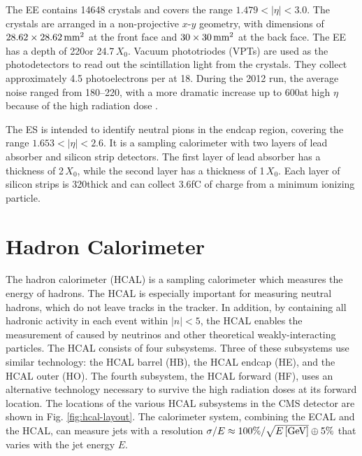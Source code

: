 The EE contains 14648 \pbwo crystals and covers the range $1.479<|\eta|<3.0$. The crystals are arranged in a non-projective $x$-$y$ geometry, with dimensions of $28.62\times28.62\,\text{mm}^{2}$ at the front face and $30\times30\,\text{mm}^{2}$ at the back face. The EE has a depth of 220\mm or 24.7$\,X_{0}$. Vacuum phototriodes (VPTs) are used as the photodetectors to read out the scintillation light from the \pbwo crystals. They collect approximately 4.5 photoelectrons per \MeVns at 18\degC. During the 2012 run, the average noise ranged from 180--220\MeV, with a more dramatic increase up to 600\MeV at high $\eta$ because of the high radiation dose \cite{CMS:2013ecal}.

The ES is intended to identify neutral pions in the endcap region, covering the range $1.653<|\eta|<2.6$. It is a sampling calorimeter with two layers of lead absorber and silicon strip detectors. The first layer of lead absorber has a thickness of 2$\,X_{0}$, while the second layer has a thickness of 1$\,X_{0}$. Each layer of silicon strips is 320\mum thick and can collect 3.6\unit{fC} of charge from a minimum ionizing particle.


\section{Hadron Calorimeter}

The hadron calorimeter (HCAL) is a sampling calorimeter which measures the energy of hadrons. The HCAL is especially important for measuring neutral hadrons, which do not leave tracks in the tracker. In addition, by containing all hadronic activity in each event within $|n|<5$, the HCAL enables the measurement of \met caused by neutrinos and other theoretical weakly-interacting particles. The HCAL consists of four subsystems. Three of these subsystems use similar technology: the HCAL barrel (HB), the HCAL endcap (HE), and the HCAL outer (HO). The fourth subsystem, the HCAL forward (HF), uses an alternative technology necessary to survive the high radiation doses at its forward location. The locations of the various HCAL subsystems in the CMS detector are shown in Fig. \ref{fig:hcal-layout}. The calorimeter system, combining the ECAL and the HCAL, can measure jets with a resolution $\sigma/E \approx 100\% / \sqrt{E\,[\text{Ge\hspace{-.08em}V}]} \oplus 5\%$ that varies with the jet energy $E$.

